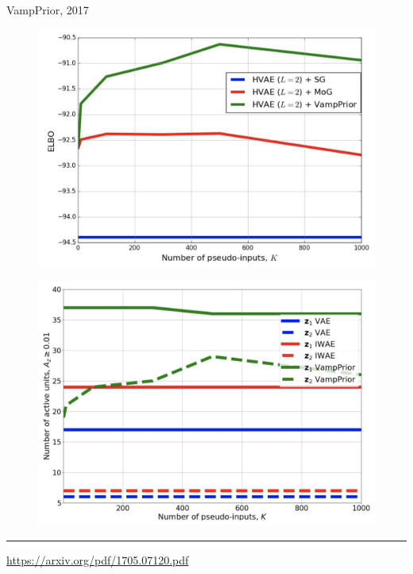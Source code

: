 \documentclass{beamer}
\begin{document}
\begin{frame}{VampPrior, 2017}
\vspace{1.5cm}
	\begin{minipage}[t]{0.5\columnwidth}
		\begin{figure}[h]
			\centering
			\includegraphics[width=1.\linewidth]{figs/VampPrior_2.png}
		\end{figure}
	\end{minipage}%
	\begin{minipage}[t]{0.5\columnwidth}
		\begin{figure}[h]
			\centering
			\includegraphics[width=1.\linewidth]{figs/VampPrior_3.png}
		\end{figure}
	\end{minipage}
\vspace{1.5cm}
\vfill
\hrule\medskip
{\scriptsize \href{https://arxiv.org/pdf/1705.07120.pdf}{https://arxiv.org/pdf/1705.07120.pdf}}
\end{frame}
\end{document}
